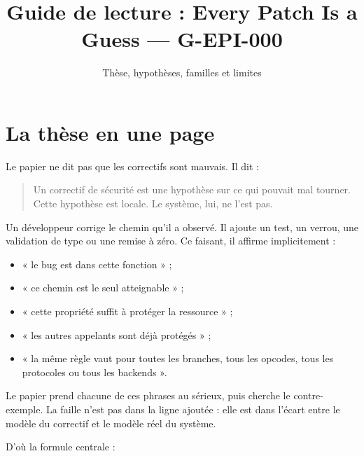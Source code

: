 \documentclass{training}
\begin{document}
\title{Guide de lecture : Every Patch Is a Guess --- G-EPI-000}
\subtitle{Thèse, hypothèses, familles et limites}
\maketitle

\newpage
\tableofcontents
\newpage

\chapter{La thèse en une page}

Le papier ne dit pas que les correctifs sont mauvais. Il dit :

\begin{quote}
Un correctif de sécurité est une hypothèse sur ce qui pouvait mal tourner.
Cette hypothèse est locale. Le système, lui, ne l'est pas.
\end{quote}

Un développeur corrige le chemin qu'il a observé. Il ajoute un test, un
verrou, une validation de type ou une remise à zéro. Ce faisant, il affirme
implicitement :

\begin{itemize}
  \item « le bug est dans cette fonction » ;
  \item « ce chemin est le seul atteignable » ;
  \item « cette propriété suffit à protéger la ressource » ;
  \item « les autres appelants sont déjà protégés » ;
  \item « la même règle vaut pour toutes les branches, tous les opcodes,
        tous les protocoles ou tous les backends ».
\end{itemize}

Le papier prend chacune de ces phrases au sérieux, puis cherche le
contre-exemple. La faille n'est pas dans la ligne ajoutée : elle est dans
l'écart entre le modèle du correctif et le modèle réel du système.

D'où la formule centrale :
\end{document}
